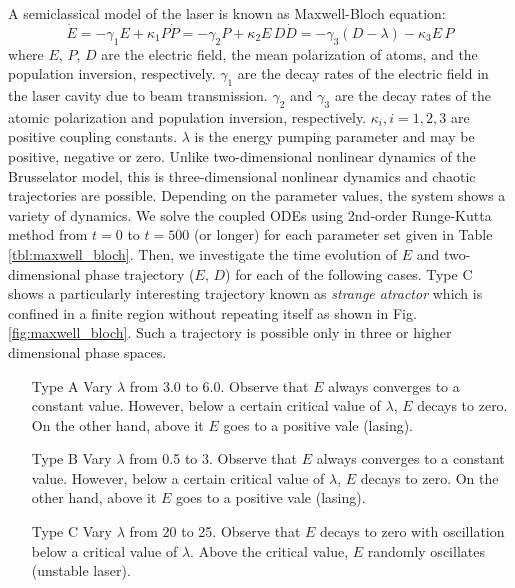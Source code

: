\medskip\noindent
A semiclassical model of the laser is known as Maxwell-Bloch equation\cite{chaos1,chaos2}:
\begin{subequations}\label{eq:maxwell-bloch}
	\begin{equation}
	\dot{E} = - \gamma_1 E + \kappa_1 P 
	\end{equation}
	\begin{equation}
	\dot{P} = - \gamma_2 P + \kappa_2 E\, D
	\end{equation}
	\begin{equation}
	\dot{D} = - \gamma_3 (D-\lambda) - \kappa_3 E\, P
	\end{equation}
\end{subequations}
\noindent
where $E$, $P$, $D$ are the electric field, the mean polarization of atoms, and the population inversion, respectively.
$\gamma_1$ are the decay rates of the electric field in the laser cavity due to beam transmission.  $\gamma_2$ and $\gamma_3$ are the decay rates of the atomic polarization and population inversion, respectively. $\kappa_i, i=1,2,3$ are positive coupling constants.  $\lambda$ is the energy pumping parameter and may be positive, negative or zero.  Unlike two-dimensional nonlinear dynamics of the Brusselator model, this is three-dimensional nonlinear dynamics and chaotic trajectories are possible. Depending on the parameter values, the system shows a variety of dynamics. We solve the coupled ODEs using 2nd-order Runge-Kutta method from $t=0$ to $t=500$ (or longer) for each parameter set given in Table \ref{tbl:maxwell_bloch}. Then, we investigate the time evolution of $E$ and two-dimensional phase trajectory ($E$, $D$) for each of  the following cases. Type C shows a particularly interesting trajectory known as \emph{strange atractor} which is confined in a finite region without repeating itself as shown in Fig. \ref{fig:maxwell_bloch}.  Such a trajectory is possible only in three or higher dimensional phase spaces.

\begin{center}
\begin{minipage}{5.5in}  
\begin{itemize}
\item [Type A] Vary $\lambda$ from 3.0 to 6.0.  Observe that $E$ always converges to a constant value.  However, below a certain critical value of $\lambda$, $E$ decays to zero.  On the other hand, above it $E$ goes to a positive vale (lasing).
\item [Type B] Vary $\lambda$ from 0.5 to 3. Observe that $E$ always converges to a constant value.  However, below a certain critical value of $\lambda$, $E$ decays to zero.  On the other hand, above it $E$ goes to a positive vale (lasing).
\item [Type C] Vary $\lambda$ from 20 to 25. Observe that $E$ decays to zero with oscillation below a critical value of $\lambda$.  Above the critical value, $E$ randomly oscillates (unstable laser).
\end{itemize}
\end{minipage}
\end{center}

